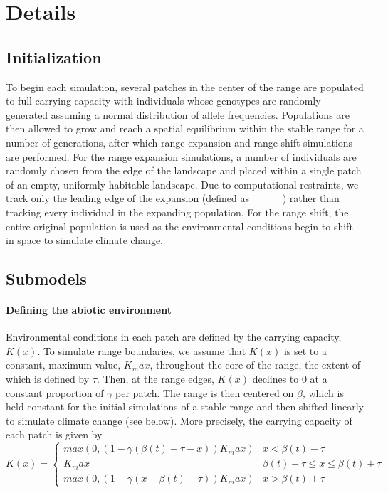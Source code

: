 \documentclass[11pt]{article}
\begin{document}
\section*{Details}
\subsection*{Initialization} 
To begin each simulation, several patches in the center of the range are populated to full carrying capacity with individuals whose genotypes are randomly generated assuming a normal distribution of allele frequencies. Populations are then allowed to grow and reach a spatial equilibrium within the stable range for a number of generations, after which range expansion and range shift simulations are performed. For the range expansion simulations, a number of individuals are randomly chosen from the edge of the landscape and placed within a single patch of an empty, uniformly habitable landscape. Due to computational restraints, we track only the leading edge of the expansion (defined as \_\_\_\_) rather than tracking every individual in the expanding population. For the range shift, the entire original population is used as the environmental conditions begin to shift in space to simulate climate change.

\subsection*{Submodels}
\paragraph{Defining the abiotic environment}
Environmental conditions in each patch are defined by the carrying capacity, $K(x)$. To simulate range boundaries, we assume that $K(x)$ is set to a constant, maximum value, $K_max$, throughout the core of the range, the extent of which is defined by $\tau$. Then, at the range edges, $K(x)$ declines to $0$ at a constant proportion of $\gamma$ per patch. The range is then centered on $\beta$, which is held constant for the initial simulations of a stable range and then shifted linearly to simulate climate change (see below). More precisely, the carrying capacity of each patch is given by
\begin{equation}
K(x)=
\begin{cases}
	max(0, (1-\gamma(\beta(t) - \tau - x))K_max) & x < \beta(t) - \tau \\
	K_max & \beta(t) - \tau \leq x \leq \beta(t) + \tau \\
	max(0, (1-\gamma(x - \beta(t) - \tau))K_max) & x > \beta(t) + \tau
\end{cases}
\end{equation}
 
\end{document}
